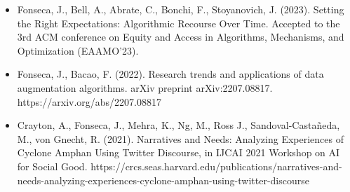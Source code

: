 \begin{itemize}

    \item Fonseca, J., Bell, A., Abrate, C., Bonchi, F., Stoyanovich, J.
        (2023). Setting the Right Expectations: Algorithmic Recourse Over
        Time. Accepted to the 3rd ACM conference on Equity and Access in
        Algorithms, Mechanisms, and Optimization (EAAMO'23).

    \item Fonseca, J., Bacao, F. (2022). Research trends and applications of
        data augmentation algorithms. arXiv preprint arXiv:2207.08817.
        https://arxiv.org/abs/2207.08817

    \item Crayton, A., Fonseca, J., Mehra, K., Ng, M., Ross J.,
        Sandoval-Castañeda, M., von Gnecht, R. (2021). Narratives and Needs:
        Analyzing Experiences of Cyclone Amphan Using Twitter Discourse, in
        IJCAI 2021 Workshop on AI for Social Good.
        https://crcs.seas.harvard.edu/publications/narratives-and-needs-analyzing-experiences-cyclone-amphan-using-twitter-discourse

\end{itemize}

